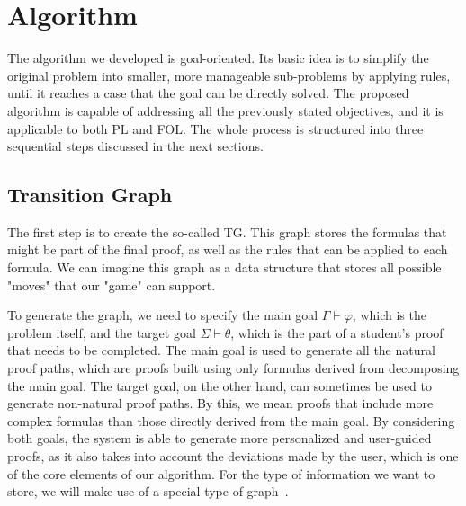 \section{Algorithm}
The algorithm we developed is goal-oriented. Its basic idea is to simplify the original problem into smaller, more manageable sub-problems by applying rules, until it reaches a case that the goal can be directly solved. The proposed algorithm is capable of addressing all the previously stated objectives, and it is applicable to both \gls{PL} and \gls{FOL}. The whole process is structured into three sequential steps discussed in the next sections.

\subsection{Transition Graph}
The first step is to create the so-called \gls{TG}. This graph stores the formulas that might be part of the final proof, as well as the rules that can be applied to each formula.  We can imagine this graph as a data structure that stores all possible "moves" that our "game" can support.

To generate the graph, we need to specify the main goal \(\Gamma \vdash \varphi\), which is the problem itself, and the target goal \(\Sigma \vdash \theta\), which is the part of a student's proof that needs to be completed. The main goal is used to generate all the natural proof paths, which are proofs built using only formulas derived from decomposing the main goal. The target goal, on the other hand, can sometimes be used to generate non-natural proof paths. By this, we mean proofs that include more complex formulas than those directly derived from the main goal. By considering both goals, the system is able to generate more personalized and user-guided proofs, as it also takes into account the deviations made by the user, which is one of the core elements of our algorithm. For the type of information we want to store, we will make use of a special type of graph~\cite{DBLP:journals/corr/abs-2002-05014}.

